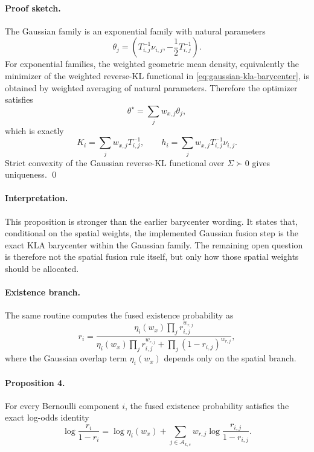 \paragraph{Proof sketch.}
The Gaussian family is an exponential family with natural parameters
\begin{equation}
\theta_j = \left(T_{i,j}^{-1}\nu_{i,j}, -\frac{1}{2}T_{i,j}^{-1}\right).
\end{equation}
For exponential families, the weighted geometric mean density, equivalently the minimizer of the weighted reverse-KL functional in \eqref{eq:gaussian-kla-barycenter}, is obtained by weighted averaging of natural parameters. Therefore the optimizer satisfies
\begin{equation}
\theta^\star = \sum_j w_{x,j}\theta_j,
\end{equation}
which is exactly
\begin{equation}
K_i = \sum_j w_{x,j}T_{i,j}^{-1},
\qquad
h_i = \sum_j w_{x,j}T_{i,j}^{-1}\nu_{i,j}.
\end{equation}
Strict convexity of the Gaussian reverse-KL functional over $\Sigma \succ 0$ gives uniqueness. \qed

\paragraph{Interpretation.}
This proposition is stronger than the earlier barycenter wording. It states that, conditional on the spatial weights, the implemented Gaussian fusion step is the exact KLA barycenter within the Gaussian family. The remaining open question is therefore not the spatial fusion rule itself, but only how those spatial weights should be allocated.

\paragraph{Existence branch.}
The same routine computes the fused existence probability as
\begin{equation}
r_i
=
\frac{
\eta_i(w_x)\prod_j r_{i,j}^{w_{r,j}}
}{
\eta_i(w_x)\prod_j r_{i,j}^{w_{r,j}} + \prod_j (1-r_{i,j})^{w_{r,j}}
},
\end{equation}
where the Gaussian overlap term $\eta_i(w_x)$ depends only on the spatial branch.

\paragraph{Proposition 4.}
For every Bernoulli component $i$, the fused existence probability satisfies the exact log-odds identity
\begin{equation}
\log \frac{r_i}{1-r_i}
=
\log \eta_i(w_x)
+
\sum_{j \in \mathcal{A}_{k,s}} w_{r,j} \log \frac{r_{i,j}}{1-r_{i,j}}.
\label{eq:exact-logit-pooling}
\end{equation}

